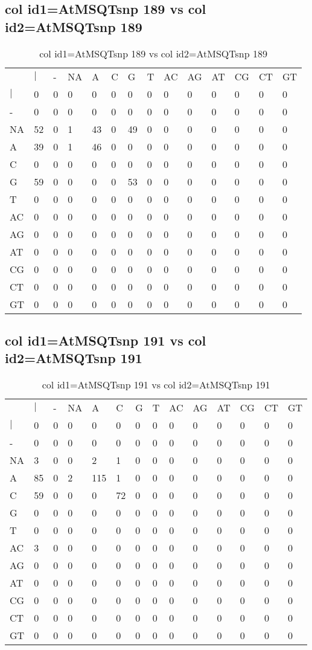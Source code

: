 \subsection{col id1=AtMSQTsnp 189 vs col id2=AtMSQTsnp 189}
\begin{center}
\begin{longtable}{|l|l|l|l|l|l|l|l|l|l|l|l|l|l|}
\caption{col id1=AtMSQTsnp 189 vs col id2=AtMSQTsnp 189} \label{table_dm762}\\
\hline
\\
\hline
&$|$&-&NA&A&C&G&T&AC&AG&AT&CG&CT&GT\\
$|$&0&0&0&0&0&0&0&0&0&0&0&0&0\\
-&0&0&0&0&0&0&0&0&0&0&0&0&0\\
NA&52&0&1&43&0&49&0&0&0&0&0&0&0\\
A&39&0&1&46&0&0&0&0&0&0&0&0&0\\
C&0&0&0&0&0&0&0&0&0&0&0&0&0\\
G&59&0&0&0&0&53&0&0&0&0&0&0&0\\
T&0&0&0&0&0&0&0&0&0&0&0&0&0\\
AC&0&0&0&0&0&0&0&0&0&0&0&0&0\\
AG&0&0&0&0&0&0&0&0&0&0&0&0&0\\
AT&0&0&0&0&0&0&0&0&0&0&0&0&0\\
CG&0&0&0&0&0&0&0&0&0&0&0&0&0\\
CT&0&0&0&0&0&0&0&0&0&0&0&0&0\\
GT&0&0&0&0&0&0&0&0&0&0&0&0&0\\
\hline
\end{longtable}
\end{center}

\subsection{col id1=AtMSQTsnp 191 vs col id2=AtMSQTsnp 191}
\begin{center}
\begin{longtable}{|l|l|l|l|l|l|l|l|l|l|l|l|l|l|}
\caption{col id1=AtMSQTsnp 191 vs col id2=AtMSQTsnp 191} \label{table_dm764}\\
\hline
\\
\hline
&$|$&-&NA&A&C&G&T&AC&AG&AT&CG&CT&GT\\
$|$&0&0&0&0&0&0&0&0&0&0&0&0&0\\
-&0&0&0&0&0&0&0&0&0&0&0&0&0\\
NA&3&0&0&2&1&0&0&0&0&0&0&0&0\\
A&85&0&2&115&1&0&0&0&0&0&0&0&0\\
C&59&0&0&0&72&0&0&0&0&0&0&0&0\\
G&0&0&0&0&0&0&0&0&0&0&0&0&0\\
T&0&0&0&0&0&0&0&0&0&0&0&0&0\\
AC&3&0&0&0&0&0&0&0&0&0&0&0&0\\
AG&0&0&0&0&0&0&0&0&0&0&0&0&0\\
AT&0&0&0&0&0&0&0&0&0&0&0&0&0\\
CG&0&0&0&0&0&0&0&0&0&0&0&0&0\\
CT&0&0&0&0&0&0&0&0&0&0&0&0&0\\
GT&0&0&0&0&0&0&0&0&0&0&0&0&0\\
\hline
\end{longtable}
\end{center}

